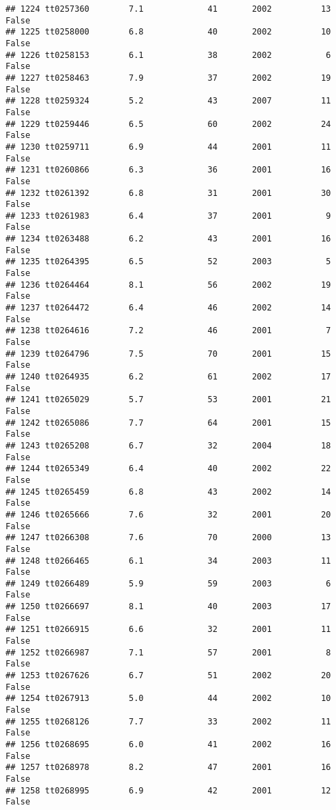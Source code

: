 \documentclass[
]{article}
\begin{document}
\begin{verbatim}
## 1224 tt0257360        7.1             41       2002          13   False
## 1225 tt0258000        6.8             40       2002          10   False
## 1226 tt0258153        6.1             38       2002           6   False
## 1227 tt0258463        7.9             37       2002          19   False
## 1228 tt0259324        5.2             43       2007          11   False
## 1229 tt0259446        6.5             60       2002          24   False
## 1230 tt0259711        6.9             44       2001          11   False
## 1231 tt0260866        6.3             36       2001          16   False
## 1232 tt0261392        6.8             31       2001          30   False
## 1233 tt0261983        6.4             37       2001           9   False
## 1234 tt0263488        6.2             43       2001          16   False
## 1235 tt0264395        6.5             52       2003           5   False
## 1236 tt0264464        8.1             56       2002          19   False
## 1237 tt0264472        6.4             46       2002          14   False
## 1238 tt0264616        7.2             46       2001           7   False
## 1239 tt0264796        7.5             70       2001          15   False
## 1240 tt0264935        6.2             61       2002          17   False
## 1241 tt0265029        5.7             53       2001          21   False
## 1242 tt0265086        7.7             64       2001          15   False
## 1243 tt0265208        6.7             32       2004          18   False
## 1244 tt0265349        6.4             40       2002          22   False
## 1245 tt0265459        6.8             43       2002          14   False
## 1246 tt0265666        7.6             32       2001          20   False
## 1247 tt0266308        7.6             70       2000          13   False
## 1248 tt0266465        6.1             34       2003          11   False
## 1249 tt0266489        5.9             59       2003           6   False
## 1250 tt0266697        8.1             40       2003          17   False
## 1251 tt0266915        6.6             32       2001          11   False
## 1252 tt0266987        7.1             57       2001           8   False
## 1253 tt0267626        6.7             51       2002          20   False
## 1254 tt0267913        5.0             44       2002          10   False
## 1255 tt0268126        7.7             33       2002          11   False
## 1256 tt0268695        6.0             41       2002          16   False
## 1257 tt0268978        8.2             47       2001          16   False
## 1258 tt0268995        6.9             42       2001          12   False

\end{verbatim}
\end{document}
